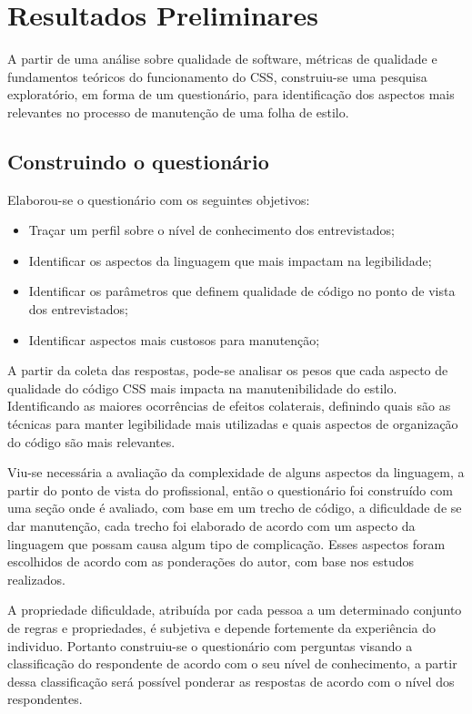 %
%

\chapter{Resultados Preliminares}

A partir de uma análise sobre qualidade de software, métricas de qualidade e fundamentos teóricos do funcionamento do CSS, construiu-se uma pesquisa exploratório, em forma de um questionário, para identificação dos aspectos mais relevantes no processo de manutenção de uma folha de estilo.

\section{Construindo o questionário}
Elaborou-se o questionário com os seguintes objetivos:

\begin{itemize}
	\item Traçar um perfil sobre o nível de conhecimento dos entrevistados;
	\item Identificar os aspectos da linguagem que mais impactam na legibilidade;
	\item Identificar os parâmetros que definem qualidade de código no ponto de vista dos entrevistados;
	\item Identificar aspectos mais custosos para manutenção;	
\end{itemize}

A partir da coleta das respostas, pode-se analisar os pesos que cada aspecto de qualidade do código CSS mais impacta na manutenibilidade do estilo. Identificando as maiores ocorrências de efeitos colaterais, definindo quais são as técnicas para manter legibilidade mais utilizadas e quais aspectos de organização do código são mais relevantes.

Viu-se necessária a avaliação da complexidade de alguns aspectos da linguagem, a partir do ponto de vista do profissional, então o questionário foi construído com uma seção onde é avaliado, com base em um trecho de código, a dificuldade de se dar manutenção, cada trecho foi elaborado de acordo com um aspecto da linguagem que possam causa algum tipo de complicação. Esses aspectos foram escolhidos de acordo com as ponderações do autor, com base nos estudos realizados.

A propriedade dificuldade, atribuída por cada pessoa a um determinado conjunto de regras e propriedades, é subjetiva e depende fortemente da experiência do individuo. Portanto construiu-se o questionário com perguntas visando a classificação do respondente de acordo com o seu nível de conhecimento, a partir dessa classificação será possível ponderar as respostas de acordo com o nível dos respondentes.